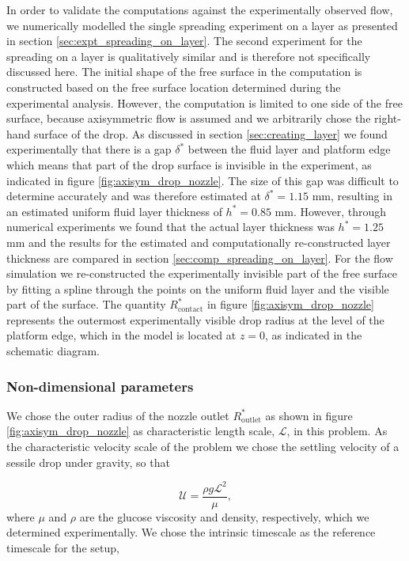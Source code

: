 \documentclass[aip,graphicx]{revtex4-1}
\newcommand{\sym}[1]{\text{#1}}
\begin{document}
In order to validate the computations against the experimentally observed flow, we numerically modelled the single spreading experiment on a layer as presented in section \ref{sec:expt_spreading_on_layer}.
The second experiment for the spreading on a layer is qualitatively similar and is therefore not specifically discussed here.
The initial shape of the free surface in the computation is constructed based on the free surface location determined during the experimental analysis.
However, the computation is limited to one side of the free surface, because axisymmetric flow is assumed and we arbitrarily chose the right-hand surface of the drop.
As discussed in section \ref{sec:creating_layer} we found experimentally that there is a gap $\delta^*$ between the fluid layer and platform edge which means that part of the drop surface is invisible in the experiment, as indicated in figure \ref{fig:axisym_drop_nozzle}.
The size of this gap was difficult to determine accurately and was therefore estimated at $\delta^*=1.15$ mm, resulting in an estimated uniform fluid layer thickness of $h^*=0.85$ mm.
However, through numerical experiments we found that the actual layer thickness was $h^*=1.25$ mm and the results for the estimated and computationally re-constructed layer thickness are compared in section \ref{sec:comp_spreading_on_layer}.
For the flow simulation we re-constructed the experimentally invisible part of the free surface by fitting a spline through the points on the uniform fluid layer and the visible part of the surface.
The quantity $R_{\sym{contact}}^*$ in figure \ref{fig:axisym_drop_nozzle} represents the outermost experimentally visible drop radius at the level of the platform edge, which in the model is located at $z=0$, as indicated in the schematic diagram.

\subsubsection{Non-dimensional parameters}

We chose the outer radius of the nozzle outlet $R_{\sym{outlet}}^*$ as shown in figure \ref{fig:axisym_drop_nozzle} as characteristic length scale, $\mathcal{L}$, in this problem.
As the characteristic velocity scale of the problem we chose the settling velocity of a sessile drop under gravity, so that

\begin{equation}
 \mathcal{U}=\frac{\rho g \mathcal{L}^2}{\mu},
 \label{eqn:vel_scale}
\end{equation}
where $\mu$ and $\rho$ are the glucose viscosity and density, respectively, which we determined experimentally.
We chose the intrinsic timescale as the reference timescale for the setup,
\end{document}

